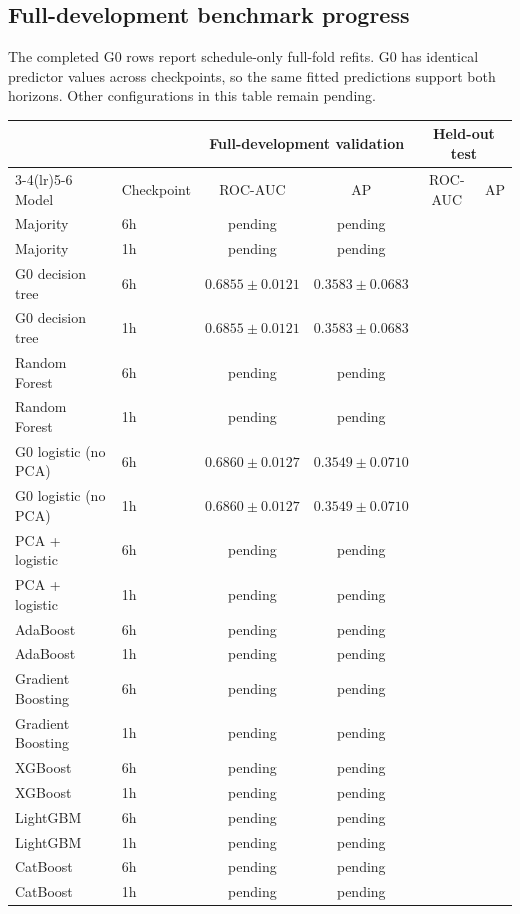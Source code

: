 \documentclass{article}
\begin{document}
\subsection{Full-development benchmark progress}

The completed G0 rows report schedule-only full-fold refits. G0 has identical
predictor values across checkpoints, so the same fitted predictions support
both horizons. Other configurations in this table remain pending.

\begin{center}\small
\begin{tabular}{llcccc}\toprule
 & & \multicolumn{2}{c}{Full-development validation} & \multicolumn{2}{c}{Held-out test} \\
\cmidrule(lr){3-4}\cmidrule(lr){5-6}
Model & Checkpoint & ROC-AUC & AP & ROC-AUC & AP \\
\midrule
Majority & 6h & pending & pending &  &  \\
Majority & 1h & pending & pending &  &  \\
G0 decision tree & 6h & \(0.6855\pm0.0121\) & \(0.3583\pm0.0683\) &  &  \\
G0 decision tree & 1h & \(0.6855\pm0.0121\) & \(0.3583\pm0.0683\) &  &  \\
Random Forest & 6h & pending & pending &  &  \\
Random Forest & 1h & pending & pending &  &  \\
G0 logistic (no PCA) & 6h & \(0.6860\pm0.0127\) & \(0.3549\pm0.0710\) &  &  \\
G0 logistic (no PCA) & 1h & \(0.6860\pm0.0127\) & \(0.3549\pm0.0710\) &  &  \\
PCA + logistic & 6h & pending & pending &  &  \\
PCA + logistic & 1h & pending & pending &  &  \\
AdaBoost & 6h & pending & pending &  &  \\
AdaBoost & 1h & pending & pending &  &  \\
Gradient Boosting & 6h & pending & pending &  &  \\
Gradient Boosting & 1h & pending & pending &  &  \\
XGBoost & 6h & pending & pending &  &  \\
XGBoost & 1h & pending & pending &  &  \\
LightGBM & 6h & pending & pending &  &  \\
LightGBM & 1h & pending & pending &  &  \\
CatBoost & 6h & pending & pending &  &  \\
CatBoost & 1h & pending & pending &  &  \\
\bottomrule\end{tabular}\end{center}
\end{document}
